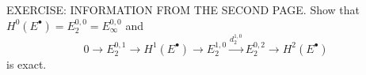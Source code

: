 EXERCISE: INFORMATION FROM THE SECOND PAGE. Show that $H^0(E^\bullet)=E_2^{0,0}=E_\infty^{0,0}$ and
$$0\to E_2^{0,1}\to H^1(E^\bullet)\to E_2^{1,0}\xrightarrow{d_2^{1,0}}E_2^{0,2}\to H^2(E^\bullet)$$
is exact.
